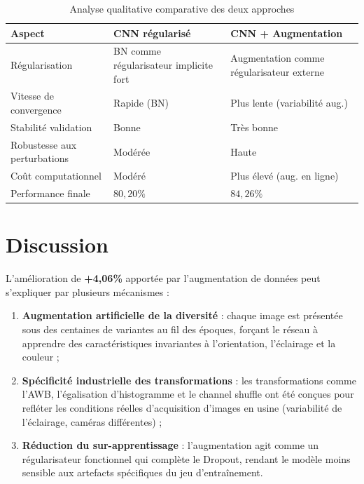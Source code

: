 \begin{table}[H]
\centering
\caption{Analyse qualitative comparative des deux approches}
\label{tab:qualitative}
\renewcommand{\arraystretch}{1.3}
\begin{tabular}{|p{5cm}|p{4.5cm}|p{4.5cm}|}
\hline
\textbf{Aspect} & \textbf{CNN régularisé} & \textbf{CNN + Augmentation} \\
\hline
Régularisation & BN comme régularisateur implicite fort & Augmentation comme régularisateur externe \\
\hline
Vitesse de convergence & Rapide (BN) & Plus lente (variabilité aug.) \\
\hline
Stabilité validation & Bonne & Très bonne \\
\hline
Robustesse aux perturbations & Modérée & Haute \\
\hline
Coût computationnel & Modéré & Plus élevé (aug. en ligne) \\
\hline
Performance finale & $80{,}20\%$ & $84{,}26\%$ \\
\hline
\end{tabular}
\end{table}
\section{Discussion}

L'amélioration de \textbf{+4{,}06\%} apportée par l'augmentation de données
peut s'expliquer par plusieurs mécanismes :

\begin{enumerate}
  \item \textbf{Augmentation artificielle de la diversité} : chaque image est
        présentée sous des centaines de variantes au fil des époques, forçant
        le réseau à apprendre des caractéristiques invariantes à l'orientation,
        l'éclairage et la couleur ;

  \item \textbf{Spécificité industrielle des transformations} : les transformations
        comme l'AWB, l'égalisation d'histogramme et le channel shuffle ont été
        conçues pour refléter les conditions réelles d'acquisition d'images en
        usine (variabilité de l'éclairage, caméras différentes) ;

  \item \textbf{Réduction du sur-apprentissage} : l'augmentation agit comme un
        régularisateur fonctionnel qui complète le Dropout, rendant le modèle
        moins sensible aux artefacts spécifiques du jeu d'entraînement.
\end{enumerate}